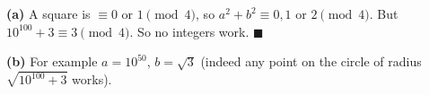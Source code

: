 \textbf{(a)} A square is $\equiv0$ or $1\pmod4$, so $a^2+b^2\equiv0,1$ or $2\pmod4$. But $10^{100}+3\equiv3\pmod4$. So no integers work. $\blacksquare$

\textbf{(b)} For example $a=10^{50}$, $b=\sqrt3$ (indeed any point on the circle of radius $\sqrt{10^{100}+3}$ works).
